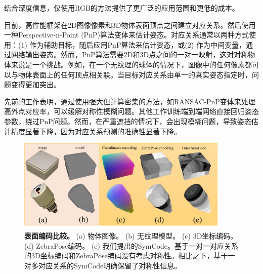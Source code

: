 结合深度信息\cite{9191119, 9429889, 9933183, 9206072, 2024hipose}，仅使用RGB的方法\cite{8765585, billings2019silhonet, hybridpose}提供了更广泛的应用范围和更低的成本。

目前，高性能框架\cite{wang2021gdr, su2022zebrapose}在2D图像像素和3D物体表面顶点之间建立对应关系。然后使用一种Perspective-n-Point (PnP)算法变体\cite{EPnP}来估计姿态。对应关系通常以两种方式使用：(1) 作为辅助目标\cite{su2022zebrapose}，随后应用PnP算法来估计姿态，或(2) 作为中间变量，通过网络输出姿态\cite{wang2021gdr}。然而，PnP算法需要2D和3D点之间的一对一映射，这对对称物体来说是一个挑战。例如，在一个无纹理的球体的情况下，图像中的任何像素都可以与物体表面上的任何顶点相关联。当目标对应关系由单一的真实姿态指定时，问题变得更加突出。

先前的工作\cite{pvnet, park2019pix2pose, su2022zebrapose}表明，通过使用强大但计算密集的方法，如RANSAC-PnP变体来处理高外点对应率，可以缓解对称性模糊问题。其他工作\cite{wang2021gdr, di2021so}训练端到端网络直接回归姿态参数，绕过PnP问题。然而，在严重遮挡的情况下，会出现模糊问题，导致姿态估计精度显著下降，因为对应关系预测的准确性显著下降。

\begin{figure}[t]
        \centerline{\includegraphics[width=0.90\textwidth]{figure/symnet/compare_encoder.jpg}}
        \caption{\textbf{表面编码比较。} (a) 物体图像。 (b) 无纹理模型。 (c) 3D坐标编码。 (d) ZebraPose编码\cite{su2022zebrapose}。 (e) 我们提出的SymCode。基于一对一对应关系的3D坐标编码和ZebraPose编码没有考虑对称性。相比之下，基于一对多对应关系的SymCode明确保留了对称性信息。}
        \label{compare_encoder}
\end{figure}